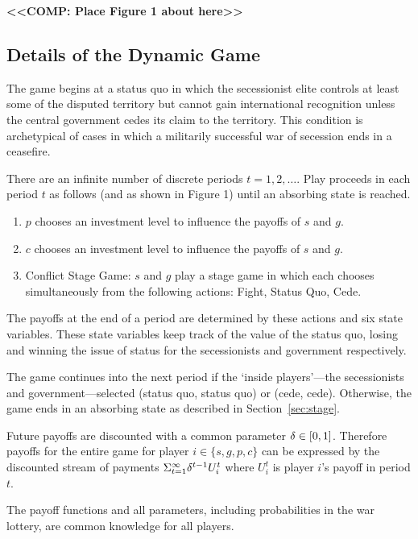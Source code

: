 \textbf{<<COMP: Place Figure 1 about here>>}

\subsection{Details of the Dynamic Game}
\label{sec:structure}

The game begins at a status quo in which the secessionist elite controls at least some of the disputed territory but cannot gain international recognition unless the central government cedes its claim to the territory. This condition is archetypical of cases in which a militarily successful war of secession ends in a ceasefire.  

There are an infinite number of discrete periods $t=1,2,\ldots$. Play proceeds in each period $t$ as follows (and as shown in Figure 1) until an absorbing state is reached.

\begin{enumerate} 
\item $p$ chooses an investment level to influence the payoffs of $s$ and $g$. 
 
\item $c$ chooses an investment level to influence the payoffs of $s$ and $g$.
 
\item Conflict Stage Game: $s$ and $g$ play a stage game in which each chooses simultaneously from the following actions: Fight, Status Quo, Cede. 
\end{enumerate}

The payoffs at the end of a period are determined by these actions and six state variables. These state variables keep track of the value of the status quo, losing and winning the issue of status for the secessionists and government respectively. 

The game continues into the next period if the `inside players'---the secessionists and government---selected (status quo, status quo) or (cede, cede). Otherwise, the game ends in an absorbing state as described in Section~\ref{sec:stage}.

Future payoffs are discounted with a common parameter $\delta \in [0,1]$. Therefore payoffs for the entire game for player $i\in \{s, g, p, c\} $ can be expressed by the discounted stream of payments $\Sigma_{t=1}^{\infty} \delta^{t-1} U_i^t $ where $U_i^t$ is player $i$'s payoff in period $t$.

The payoff functions and all parameters, including probabilities in the war lottery, are common knowledge for all players.


